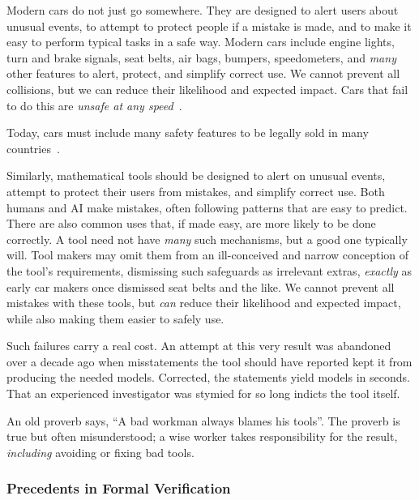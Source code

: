 Modern cars do not just go somewhere. They are designed to alert users about unusual events, to attempt to protect people if a mistake is made, and to make it easy to perform typical tasks in a safe way. Modern cars include engine lights, turn and brake signals, seat belts, air bags, bumpers, speedometers, and \emph{many} other features to alert, protect, and simplify correct use. We cannot prevent all collisions, but we can reduce their likelihood and expected impact. Cars that fail to do this are \emph{unsafe at any speed}~\cite{nader1965unsafe}.

Today, cars must include many safety features to be legally sold in many countries~\cite{fmvss208,eugsr2019,unr16}.

Similarly, mathematical tools should be designed to alert on unusual events, attempt to protect their users from mistakes, and simplify correct use. Both humans and AI make mistakes, often following patterns that are easy to predict. There are also common uses that, if made easy, are more likely to be done correctly. A tool need not have \emph{many} such mechanisms, but a good one typically will. Tool makers may omit them from an ill-conceived and narrow conception of the tool's requirements, dismissing such safeguards as irrelevant extras, \emph{exactly} as early car makers once dismissed seat belts and the like. We cannot prevent all mistakes with these tools, but \emph{can} reduce their likelihood and expected impact, while also making them easier to safely use.

Such failures carry a real cost. An attempt at this very result was abandoned over a decade ago when misstatements the tool should have reported kept it from producing the needed models. Corrected, the statements yield models in seconds. That an experienced investigator was stymied for so long indicts the tool itself.

An old proverb says, ``A bad workman always blames his tools''. The proverb is true but often misunderstood; a wise worker takes responsibility for the result, \emph{including} avoiding or fixing bad tools.

\subsubsection{Precedents in Formal Verification}

